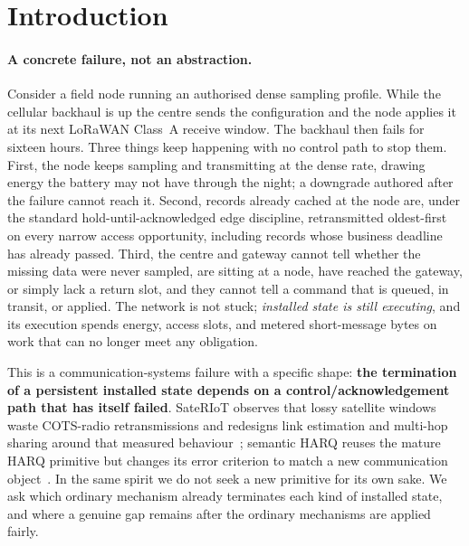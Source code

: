 \documentclass[11pt]{article}
\begin{document}
\section{Introduction}
\label{sec:intro}

\paragraph{A concrete failure, not an abstraction.}
Consider a field node running an authorised dense sampling profile. While the cellular backhaul is
up the centre sends the configuration and the node applies it at its next LoRaWAN Class~A receive
window. The backhaul then fails for sixteen hours. Three things keep happening with no control path
to stop them. First, the node keeps sampling and transmitting at the dense rate, drawing energy the
battery may not have through the night; a downgrade authored after the failure cannot reach it.
Second, records already cached at the node are, under the standard hold-until-acknowledged edge
discipline, retransmitted oldest-first on every narrow access opportunity, including records whose
business deadline has already passed. Third, the centre and gateway cannot tell whether the missing
data were never sampled, are sitting at a node, have reached the gateway, or simply lack a return
slot, and they cannot tell a command that is queued, in transit, or applied. The network is not
stuck; \emph{installed state is still executing}, and its execution spends energy, access slots,
and metered short-message bytes on work that can no longer meet any obligation.

This is a communication-systems failure with a specific shape: \textbf{the termination of a
persistent installed state depends on a control/acknowledgement path that has itself failed}.
SateRIoT observes that lossy satellite windows waste COTS-radio retransmissions and redesigns link
estimation and multi-hop sharing around that measured behaviour~\cite{sateriot}; semantic HARQ
reuses the mature HARQ primitive but changes its error criterion to match a new communication
object~\cite{razavivideo}. In the same spirit we do not seek a new primitive for its own sake. We
ask which ordinary mechanism already terminates each kind of installed state, and where a genuine
gap remains after the ordinary mechanisms are applied fairly.
\end{document}
